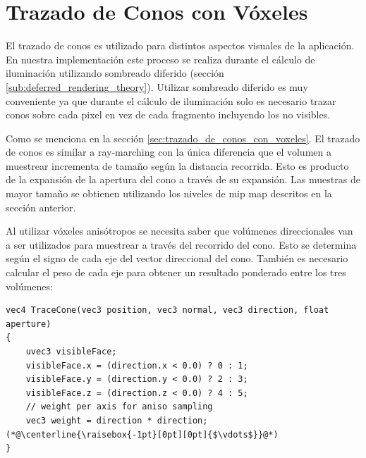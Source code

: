 \section{Trazado de Conos con Vóxeles} %
\label{sec:trazado_de_conos}
El trazado de conos es utilizado para distintos aspectos visuales de la aplicación. En nuestra implementación este proceso se realiza durante el cálculo de iluminación utilizando sombreado diferido (sección \ref{sub:deferred_rendering_theory}). Utilizar sombreado diferido es muy conveniente ya que durante el cálculo de iluminación solo es necesario trazar conos sobre cada pixel en vez de cada fragmento incluyendo los no visibles.

Como se menciona en la sección \ref{sec:trazado_de_conos_con_voxeles}. El trazado de conos es similar a ray-marching con la única diferencia que el volumen a muestrear incrementa de tamaño según la distancia recorrida. Esto es producto de la expansión de la apertura del cono a través de su expansión. Las muestras de mayor tamaño se obtienen utilizando los niveles de mip map descritos en la sección anterior.

Al utilizar vóxeles anisótropos se necesita saber que volúmenes direccionales van a ser utilizados para muestrear a través del recorrido del cono. Esto se determina según el signo de cada eje del vector direccional del cono. También es necesario calcular el peso de cada eje para obtener un resultado ponderado entre los tres volúmenes:
\\
\begin{lstlisting}[caption={Lógica para determinar volúmenes direccionales a utilizar durante el trazado de conos y peso por eje.}, label=Trace0]
vec4 TraceCone(vec3 position, vec3 normal, vec3 direction, float aperture)
{
    uvec3 visibleFace;
    visibleFace.x = (direction.x < 0.0) ? 0 : 1;
    visibleFace.y = (direction.y < 0.0) ? 2 : 3;
    visibleFace.z = (direction.z < 0.0) ? 4 : 5;
    // weight per axis for aniso sampling
    vec3 weight = direction * direction;
(*@\centerline{\raisebox{-1pt}[0pt][0pt]{$\vdots$}}@*)
}
\end{lstlisting}


